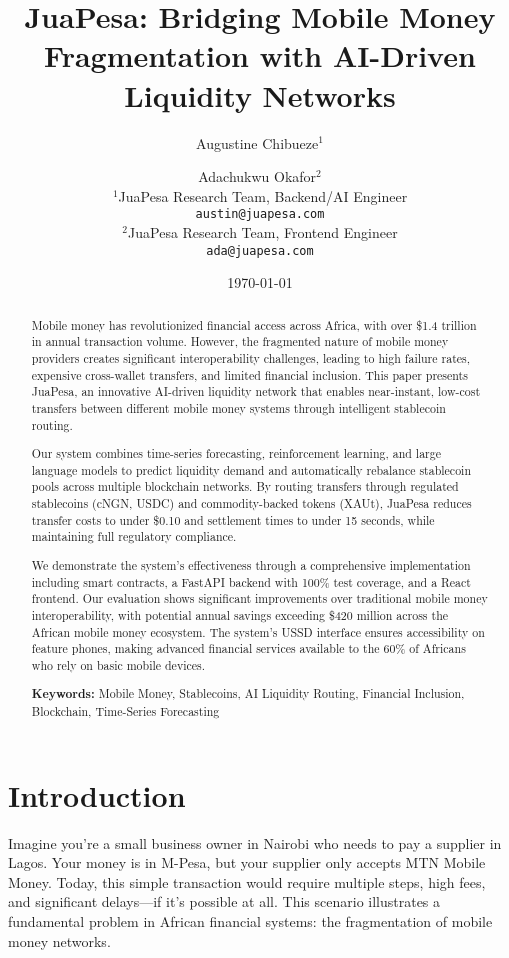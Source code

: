 \documentclass[11pt,a4paper]{article}
\title{\textbf{JuaPesa: Bridging Mobile Money Fragmentation with AI-Driven Liquidity Networks}}
\author{
    Augustine Chibueze$^1$ \and Adachukwu Okafor$^2$ \\
    $^1$JuaPesa Research Team, Backend/AI Engineer \\
    \texttt{austin@juapesa.com} \\
    $^2$JuaPesa Research Team, Frontend Engineer \\
    \texttt{ada@juapesa.com}
}
\date{\today}
\begin{document}
\maketitle

\begin{abstract}
Mobile money has revolutionized financial access across Africa, with over \$1.4 trillion in annual transaction volume. However, the fragmented nature of mobile money providers creates significant interoperability challenges, leading to high failure rates, expensive cross-wallet transfers, and limited financial inclusion. This paper presents JuaPesa, an innovative AI-driven liquidity network that enables near-instant, low-cost transfers between different mobile money systems through intelligent stablecoin routing.

Our system combines time-series forecasting, reinforcement learning, and large language models to predict liquidity demand and automatically rebalance stablecoin pools across multiple blockchain networks. By routing transfers through regulated stablecoins (cNGN, USDC) and commodity-backed tokens (XAUt), JuaPesa reduces transfer costs to under \$0.10 and settlement times to under 15 seconds, while maintaining full regulatory compliance.

We demonstrate the system's effectiveness through a comprehensive implementation including smart contracts, a FastAPI backend with 100\% test coverage, and a React frontend. Our evaluation shows significant improvements over traditional mobile money interoperability, with potential annual savings exceeding \$420 million across the African mobile money ecosystem. The system's USSD interface ensures accessibility on feature phones, making advanced financial services available to the 60\% of Africans who rely on basic mobile devices.

\textbf{Keywords:} Mobile Money, Stablecoins, AI Liquidity Routing, Financial Inclusion, Blockchain, Time-Series Forecasting
\end{abstract}

\section{Introduction}

Imagine you're a small business owner in Nairobi who needs to pay a supplier in Lagos. Your money is in M-Pesa, but your supplier only accepts MTN Mobile Money. Today, this simple transaction would require multiple steps, high fees, and significant delays—if it's possible at all. This scenario illustrates a fundamental problem in African financial systems: the fragmentation of mobile money networks.
\end{document}
